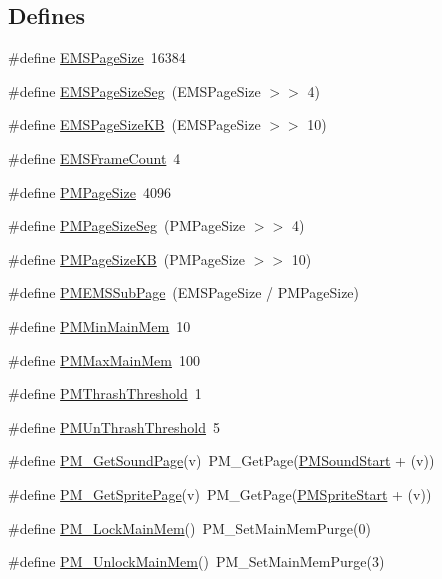 \subsection*{Defines}
\begin{DoxyCompactItemize}
\item 
\#define \hyperlink{ID__PM_8H_a856b167f452e867314b42dde91dd1984}{EMSPageSize}~16384
\item 
\#define \hyperlink{ID__PM_8H_a30071d9742e4792a5cea0c8d787a27a9}{EMSPageSizeSeg}~(EMSPageSize $>$$>$ 4)
\item 
\#define \hyperlink{ID__PM_8H_a3c0e4d41b64141a953315eda7ef6bf7c}{EMSPageSizeKB}~(EMSPageSize $>$$>$ 10)
\item 
\#define \hyperlink{ID__PM_8H_afffc419fcd53fc6a4f50bd6d9854bd1d}{EMSFrameCount}~4
\item 
\#define \hyperlink{ID__PM_8H_a5e4c70ba1e278d1d2fb9cec2b0fecadb}{PMPageSize}~4096
\item 
\#define \hyperlink{ID__PM_8H_a7d4ab7bf0b85e8db8ee6ceccacb16e39}{PMPageSizeSeg}~(PMPageSize $>$$>$ 4)
\item 
\#define \hyperlink{ID__PM_8H_aca70fe2da2793734afbb08715dd5d545}{PMPageSizeKB}~(PMPageSize $>$$>$ 10)
\item 
\#define \hyperlink{ID__PM_8H_a9f2f9b21608730589c4e27d6aa584959}{PMEMSSubPage}~(EMSPageSize / PMPageSize)
\item 
\#define \hyperlink{ID__PM_8H_a5a6fe12b7cbcef7f1fb3c798f3265db5}{PMMinMainMem}~10
\item 
\#define \hyperlink{ID__PM_8H_a82525b0875c0007597f80f287b853d05}{PMMaxMainMem}~100
\item 
\#define \hyperlink{ID__PM_8H_a7340787578cedc2eff541f5ce36699ac}{PMThrashThreshold}~1
\item 
\#define \hyperlink{ID__PM_8H_ace1e6a95fd1690cf5163da52e8334dbf}{PMUnThrashThreshold}~5
\item 
\#define \hyperlink{ID__PM_8H_a01b9735ae9bc9f8601a2dca0e4b6faf3}{PM\_\-GetSoundPage}(v)~PM\_\-GetPage(\hyperlink{ID__PM_8H_a4274c51cf3dd5e7fd0c4562376e91d3b}{PMSoundStart} + (v))
\item 
\#define \hyperlink{ID__PM_8H_ae0fd66bb8ceae9630194a465a8fc2acd}{PM\_\-GetSpritePage}(v)~PM\_\-GetPage(\hyperlink{ID__PM_8H_ac15156742487c3e546be66ffc29b4473}{PMSpriteStart} + (v))
\item 
\#define \hyperlink{ID__PM_8H_a1b8d94c3a62d20f392ed7aab4a593342}{PM\_\-LockMainMem}()~PM\_\-SetMainMemPurge(0)
\item 
\#define \hyperlink{ID__PM_8H_acd7ffa4f7a2767e6707daa821671e46b}{PM\_\-UnlockMainMem}()~PM\_\-SetMainMemPurge(3)
\end{DoxyCompactItemize}
